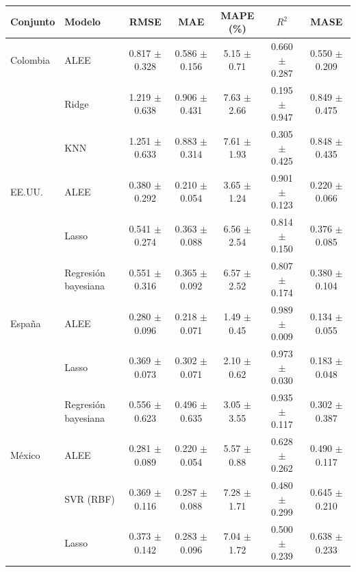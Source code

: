 \begin{tabular}{llccccc}
\toprule
Conjunto & Modelo & RMSE & MAE & MAPE (\%) & $R^2$ & MASE \\
\midrule
Colombia & ALEE & 0.817 $\pm$ 0.328 & 0.586 $\pm$ 0.156 & 5.15 $\pm$ 0.71 & 0.660 $\pm$ 0.287 & 0.550 $\pm$ 0.209 \\
 & Ridge & 1.219 $\pm$ 0.638 & 0.906 $\pm$ 0.431 & 7.63 $\pm$ 2.66 & 0.195 $\pm$ 0.947 & 0.849 $\pm$ 0.475 \\
 & KNN & 1.251 $\pm$ 0.633 & 0.883 $\pm$ 0.314 & 7.61 $\pm$ 1.93 & 0.305 $\pm$ 0.425 & 0.848 $\pm$ 0.435 \\
\midrule
EE.UU. & ALEE & 0.380 $\pm$ 0.292 & 0.210 $\pm$ 0.054 & 3.65 $\pm$ 1.24 & 0.901 $\pm$ 0.123 & 0.220 $\pm$ 0.066 \\
 & Lasso & 0.541 $\pm$ 0.274 & 0.363 $\pm$ 0.088 & 6.56 $\pm$ 2.54 & 0.814 $\pm$ 0.150 & 0.376 $\pm$ 0.085 \\
 & Regresión bayesiana & 0.551 $\pm$ 0.316 & 0.365 $\pm$ 0.092 & 6.57 $\pm$ 2.52 & 0.807 $\pm$ 0.174 & 0.380 $\pm$ 0.104 \\
\midrule
España & ALEE & 0.280 $\pm$ 0.096 & 0.218 $\pm$ 0.071 & 1.49 $\pm$ 0.45 & 0.989 $\pm$ 0.009 & 0.134 $\pm$ 0.055 \\
 & Lasso & 0.369 $\pm$ 0.073 & 0.302 $\pm$ 0.071 & 2.10 $\pm$ 0.62 & 0.973 $\pm$ 0.030 & 0.183 $\pm$ 0.048 \\
 & Regresión bayesiana & 0.556 $\pm$ 0.623 & 0.496 $\pm$ 0.635 & 3.05 $\pm$ 3.55 & 0.935 $\pm$ 0.117 & 0.302 $\pm$ 0.387 \\
\midrule
México & ALEE & 0.281 $\pm$ 0.089 & 0.220 $\pm$ 0.054 & 5.57 $\pm$ 0.88 & 0.628 $\pm$ 0.262 & 0.490 $\pm$ 0.117 \\
 & SVR (RBF) & 0.369 $\pm$ 0.116 & 0.287 $\pm$ 0.088 & 7.28 $\pm$ 1.71 & 0.480 $\pm$ 0.299 & 0.645 $\pm$ 0.210 \\
 & Lasso & 0.373 $\pm$ 0.142 & 0.283 $\pm$ 0.096 & 7.04 $\pm$ 1.72 & 0.500 $\pm$ 0.239 & 0.638 $\pm$ 0.233 \\
\bottomrule
\end{tabular}